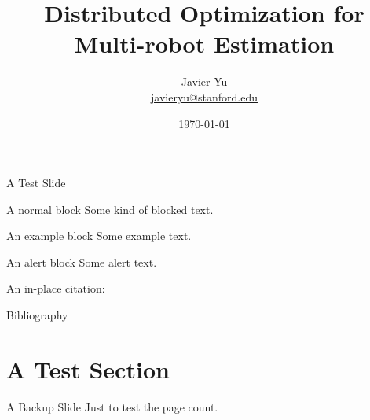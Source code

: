 \documentclass[pdf]{beamer}
\title{Distributed Optimization for Multi-robot Estimation}
\date{\today}
\author[Javier Yu]{\texorpdfstring{\Large Javier Yu \\ \footnotesize \href{javieryu@stanford.edu}{javieryu@stanford.edu}}{}}
\institute{Department of Aeronautics and Astronautics \\ Stanford University}
\begin{document}
\begin{noheadline}
\begin{frame} \maketitle \end{frame}
\end{noheadline}

\begin{frame}{A Test Slide}

\begin{block}{A normal block}
Some kind of blocked text.
\end{block}

\begin{exampleblock}{An example block}
Some example text.
\end{exampleblock}

\begin{alertblock}{An alert block}
Some alert text.
\end{alertblock}

An in-place citation: \\
\end{frame}

\begin{frame}{Bibliography}


\end{frame} 

\section{A Test Section}

\beginbackup
\begin{frame}{A Backup Slide}
Just to test the page count.
\end{frame}
\backupend
\end{document}
